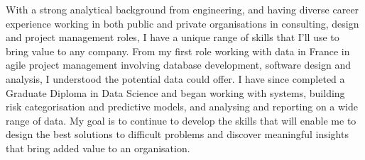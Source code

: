 %
%
%
\par{With a strong analytical background from engineering, and having diverse career experience working in both public and private organisations in consulting, design and project management roles, I have a unique range of skills that I'll use to bring value to any company.  From my first role working with data in France in agile project management involving database development, software design and analysis, I understood the potential data could offer.  I have since completed a Graduate Diploma in Data Science and began working with systems, building risk categorisation and predictive models, and analysing and reporting on a wide range of data. My goal is to continue to develop the skills that will enable me to design the best solutions to difficult problems and discover meaningful insights that bring added value to an organisation. \\

}